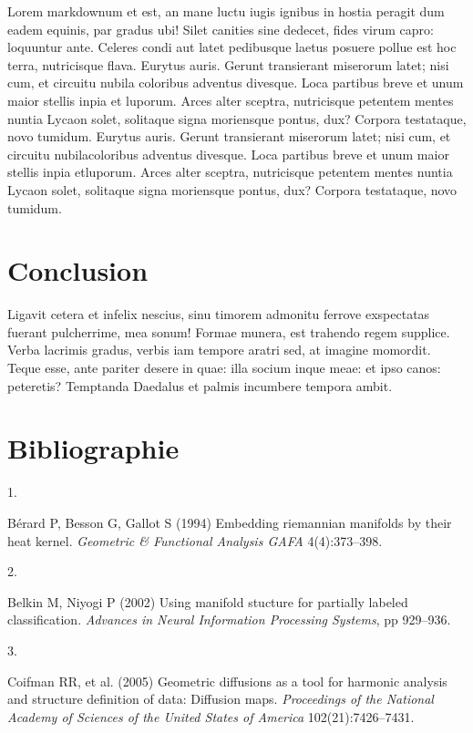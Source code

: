 \documentclass[9pt,twocolumn,twoside,]{pnas-new}
\newlength{\cslhangindent}
\newlength{\csllabelwidth}
\newlength{\cslentryspacingunit} %
\newenvironment{CSLReferences}[2] %
 {%
  \setlength{\parindent}{0pt}
  \ifodd #1
  \let\oldpar\par
  \def\par{\hangindent=\cslhangindent\oldpar}
  \fi
  \setlength{\parskip}{#2\cslentryspacingunit}
 }%
 {}
\newcommand{\CSLLeftMargin}[1]{\parbox[t]{\csllabelwidth}{#1}}
\newcommand{\CSLRightInline}[1]{\parbox[t]{\linewidth - \csllabelwidth}{#1}\break}
\begin{document}
Lorem markdownum et est, an mane luctu iugis ignibus in hostia peragit
dum eadem equinis, par gradus ubi! Silet canities sine dedecet, fides
virum capro: loquuntur ante. Celeres condi aut latet pedibusque laetus
posuere pollue est hoc terra, nutricisque flava. Eurytus auris. Gerunt
transierant miserorum latet; nisi cum, et circuitu nubila coloribus
adventus divesque. Loca partibus breve et unum maior stellis inpia et
luporum. Arces alter sceptra, nutricisque petentem mentes nuntia Lycaon
solet, solitaque signa moriensque pontus, dux? Corpora testataque, novo
tumidum. Eurytus auris. Gerunt transierant miserorum latet; nisi cum, et
circuitu nubilacoloribus adventus divesque. Loca partibus breve et unum
maior stellis inpia etluporum. Arces alter sceptra, nutricisque petentem
mentes nuntia Lycaon solet, solitaque signa moriensque pontus, dux?
Corpora testataque, novo tumidum.

\hypertarget{conclusion}{%
\section{Conclusion}\label{conclusion}}

Ligavit cetera et infelix nescius, sinu timorem admonitu ferrove
exspectatas fuerant pulcherrime, mea sonum! Formae munera, est trahendo
regem supplice. Verba lacrimis gradus, verbis iam tempore aratri sed, at
imagine momordit. Teque esse, ante pariter desere in quae: illa socium
inque meae: et ipso canos: peteretis? Temptanda Daedalus et palmis
incumbere tempora ambit.

\newpage

\hypertarget{bibliographie}{%
\section*{Bibliographie}\label{bibliographie}}

\hypertarget{refs}{}
\begin{CSLReferences}{0}{0}
\leavevmode{}%
\CSLLeftMargin{1. }
\CSLRightInline{Bérard P, Besson G, Gallot S (1994) Embedding riemannian
manifolds by their heat kernel. \emph{Geometric \& Functional Analysis
GAFA} 4(4):373--398.}

\leavevmode{}%
\CSLLeftMargin{2. }
\CSLRightInline{Belkin M, Niyogi P (2002) Using manifold stucture for
partially labeled classification. \emph{Advances in Neural Information
Processing Systems}, pp 929--936.}

\leavevmode{}%
\CSLLeftMargin{3. }
\CSLRightInline{Coifman RR, et al. (2005) Geometric diffusions as a tool
for harmonic analysis and structure definition of data: Diffusion maps.
\emph{Proceedings of the National Academy of Sciences of the United
States of America} 102(21):7426--7431.}

\end{CSLReferences}



% 
\end{document}
